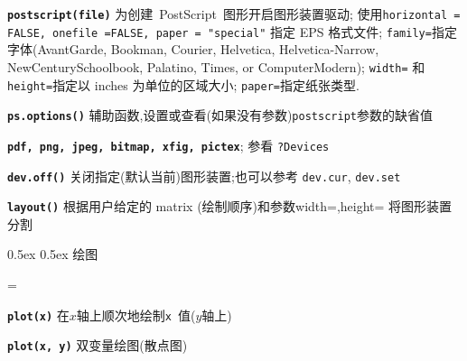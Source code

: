\documentclass[landscape]{article}
\makeatletter
\renewcommand\section{\@startsection{section}{1}{0mm}%
                                     {0.5ex}%
                                     {0.5ex}%
                                {\color{black}\normalfont\large\bfseries}}
\newcommand{\code}{\texttt}
\newcommand{\bcode}[1]{\texttt{\textbf{#1}}}
\makeatother
\begin{document}
\begin{multicols*}{3}
\bcode{postscript(file)} 为创建~PostScript~图形开启图形装置驱动;
使用\code{horizontal = FALSE, onefile =FALSE, paper = "special"} 指定 EPS 格式文件;
\code{family=}指定字体(AvantGarde, Bookman, Courier, Helvetica, Helvetica-Narrow,
     NewCenturySchoolbook, Palatino, Times, or ComputerModern);
\code{width=} 和 \code{height=}指定以 inches 为单位的区域大小;
\code{paper=}指定纸张类型.

\bcode{ps.options()}  辅助函数,设置或查看(如果没有参数)\code{postscript}参数的缺省值

\bcode{pdf, png, jpeg, bitmap, xfig, pictex}; 参看 \code{?Devices}

\bcode{dev.off()} 关闭指定(默认当前)图形装置;也可以参考  \code{dev.cur}, \code{dev.set}

\bcode{layout()} 根据用户给定的 matrix (绘制顺序)和参数width=,height= 将图形装置分割

\vspace{2mm}
\section{绘图}

\everypar={\hangindent=9mm}

\bcode{plot(x)}  在$x$轴上顺次地绘制\code{x}~值($y$轴上)

\bcode{plot(x, y)}  双变量绘图(散点图)


\end{multicols*}
\end{document}
